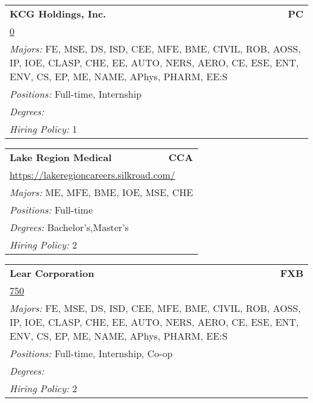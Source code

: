 \documentclass[twoside]{article}
\begin{document}
\begin{center}
\begin{multicols}{3}
\begin{FlushLeft}
\begin{minipage}{.9\columnwidth}\begin{tabularx}{.95\columnwidth}{Xr}
                 {\Large\bf KCG Holdings, Inc.} & {\Large\bf PC}\\
    \multicolumn{2}{p{.95\columnwidth}}{\url{0}}\\
    \multicolumn{2}{p{.95\columnwidth}}{\emph{Majors:} FE, MSE, DS, ISD, CEE, MFE, BME, CIVIL, ROB, AOSS, IP, IOE, CLASP, CHE, EE, AUTO, NERS, AERO, CE, ESE, ENT, ENV, CS, EP, ME, NAME, APhys, PHARM, EE:S}\\
    \multicolumn{2}{p{.95\columnwidth}}{\emph{Positions:} Full-time, Internship}\\
    \multicolumn{2}{p{.95\columnwidth}}{\emph{Degrees:} }\\
    \multicolumn{2}{p{.95\columnwidth}}{\emph{Hiring Policy:} 1}\\
    \end{tabularx}
    
\end{minipage}
 
\begin{minipage}{.9\columnwidth}\begin{tabularx}{.95\columnwidth}{Xr}
                 {\Large\bf Lake Region Medical} & {\Large\bf CCA}\\
    \multicolumn{2}{p{.95\columnwidth}}{\url{https://lakeregioncareers.silkroad.com/}}\\
    \multicolumn{2}{p{.95\columnwidth}}{\emph{Majors:} ME, MFE, BME, IOE, MSE, CHE}\\
    \multicolumn{2}{p{.95\columnwidth}}{\emph{Positions:} Full-time}\\
    \multicolumn{2}{p{.95\columnwidth}}{\emph{Degrees:} Bachelor's,Master's}\\
    \multicolumn{2}{p{.95\columnwidth}}{\emph{Hiring Policy:} 2}\\
    \end{tabularx}
    
\end{minipage}
 
\begin{minipage}{.9\columnwidth}\begin{tabularx}{.95\columnwidth}{Xr}
                 {\Large\bf Lear Corporation} & {\Large\bf FXB}\\
    \multicolumn{2}{p{.95\columnwidth}}{\url{750}}\\
    \multicolumn{2}{p{.95\columnwidth}}{\emph{Majors:} FE, MSE, DS, ISD, CEE, MFE, BME, CIVIL, ROB, AOSS, IP, IOE, CLASP, CHE, EE, AUTO, NERS, AERO, CE, ESE, ENT, ENV, CS, EP, ME, NAME, APhys, PHARM, EE:S}\\
    \multicolumn{2}{p{.95\columnwidth}}{\emph{Positions:} Full-time, Internship, Co-op}\\
    \multicolumn{2}{p{.95\columnwidth}}{\emph{Degrees:} }\\
    \multicolumn{2}{p{.95\columnwidth}}{\emph{Hiring Policy:} 2}\\
    \end{tabularx}
    

\end{minipage}
\end{FlushLeft}
\end{multicols}
\end{center}
\end{document}
